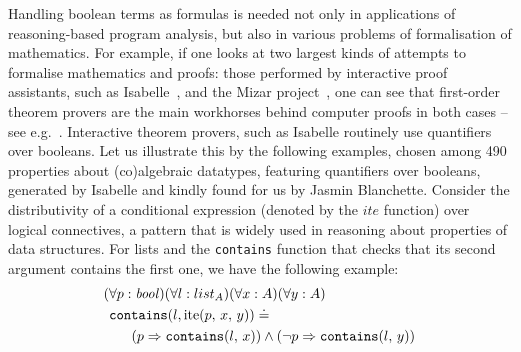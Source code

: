 Handling boolean terms as formulas is needed not only in applications of reasoning-based program analysis, but also in various problems of formalisation of mathematics.
For example, if one looks at two largest kinds of attempts to formalise mathematics and proofs: those performed by interactive proof assistants, such as Isabelle~\cite{Isabelle},  and the Mizar project~\cite{Mizar}, one can see that first-order theorem provers are the main workhorses behind computer proofs in both cases -- see e.g.~\cite{Sledgehammer,DBLP:conf/icms/UrbanHV10}.
Interactive theorem provers, such as Isabelle routinely use quantifiers over booleans.  Let us illustrate this by the
following examples, chosen among 490 properties about (co)algebraic datatypes, featuring quantifiers over booleans, generated by Isabelle and kindly found for us by Jasmin Blanchette. Consider the distributivity of a conditional expression (denoted by the $\mathit{ite}$ function) over logical connectives, a pattern that is widely used in reasoning about properties of data structures. For lists and the \verb'contains' function that checks that its second argument contains the first one, we have the following example:
\begin{gather}\label{formula:contains}
  \begin{aligned}
&(\forall{{p}:{\mathit{bool}}})(\forall{{l}:{list_A}})(\forall{{x}:{A}})(\forall{{y}:{A}}) \\
&\hspace{0.4em}\mathtt{contains}(l,\mathrm{ite}(p,\,x,\,y)) \doteq \\
&\hspace{2em} (p \Rightarrow \mathtt{contains}(l,\,x)) \wedge (\neg p \Rightarrow \mathtt{contains}(l,\,y))
 \end{aligned}
\end{gather}

